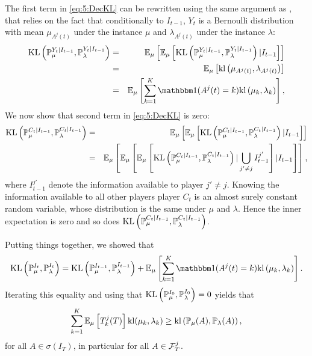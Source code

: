 The first term in \eqref{eq:5:DecKL} can be rewritten using the same argument as \cite{Garivier16TrueShape}, that relies on the fact that conditionally to $I_{t-1}$, $Y_t$ is a Bernoulli distribution with mean $\mu_{A^j(t)}$ under the instance $\mu$ and $\lambda_{A^j(t)}$ under the instance $\lambda$:
\begin{eqnarray*}
\KL\left(\Pr_{\mu}^{Y_{t}| I_{t-1}},\Pr_{\lambda}^{Y_{t}| I_{t-1}}\right)  & = & \E_\mu\left[\E_\mu\left[ \KL\left(\Pr_{\mu}^{Y_{t}| I_{t-1}},\Pr_{\lambda}^{Y_{t}| I_{t-1}}\right) | I_{t-1} \right]\right] \\
& = & \E_\mu \left[\kl \left(\mu_{A^j(t)},\lambda_{A^j(t)}\right)\right] \\
& = & \E_\mu  \left[\sum_{k=1}^K \indic{(A^j(t)=k)} \kl \left(\mu_{k},\lambda_{k}\right)\right],
\end{eqnarray*}
We now show that second term in \eqref{eq:5:DecKL} is zero:
\begin{eqnarray*}
\mathrm{KL}\left(\mathbb{P}_{\mu}^{C_t | I_{t-1}},\mathbb{P}_{\lambda}^{C_t | I_{t-1}}\right)
& = & \mathbb{E}_\mu\left[\mathbb{E}_\mu\left[ \mathrm{KL}\left(\mathbb{P}_{\mu}^{C_t| I_{t-1}},\mathbb{P}_{\lambda}^{C_t| I_{t-1}}\right) | I_{t-1} \right]\right] \\
& = & \mathbb{E}_\mu\left[\mathbb{E}_\mu\left[\mathbb{E}_\mu\left[ \mathrm{KL}\left(\mathbb{P}_{\mu}^{C_t| I_{t-1}},\mathbb{P}_{\lambda}^{C_t| I_{t-1}}\right) | \bigcup_{j' \neq j} I_{t-1}^{j'}\right]| I_{t-1} \right]\right], \\
\end{eqnarray*}
where $I_{t-1}^{j'}$ denote the information available to player $j' \neq j$.
Knowing the information available to all other players player $C_t$ is an almost surely constant random variable, whose distribution is the same under $\mu$ and $\lambda$.
Hence the inner expectation is zero and so does $\mathrm{KL}\left(\mathbb{P}_{\mu}^{C_t | I_{t-1}},\mathbb{P}_{\lambda}^{C_t | I_{t-1}}\right)$.




Putting things together, we showed that
\[\KL\left(\Pr_{\mu}^{I_t},\Pr_{\lambda}^{I_t}\right) = \KL\left(\Pr_{\mu}^{I_{t-1}},\Pr_{\lambda}^{I_{t-1}}\right) + \E_\mu  \left[\sum_{k=1}^K \indic{(A^j(t)=k)} \kl \left(\mu_{k},\lambda_{k}\right)\right].\]
Iterating this equality and using that $\mathrm{KL}\left(\mathbb{P}_{\mu}^{I_{0}},\mathbb{P}_{\lambda}^{I_{0}}\right)=0$ yields that
\[\sum_{k=1}^{K}\mathbb{E}_{\mu}\left[T_k^j(T)\right]\mathrm{kl}(\mu_k,\lambda_k) \geq \mathrm{kl} \left(\mathbb{P}_{\mu}(A),\mathbb{P}_{\lambda}(A)\right),\]
for all $A \in \sigma(I_T)$, in particular for all $A \in \mathcal{F}^j_T$.



